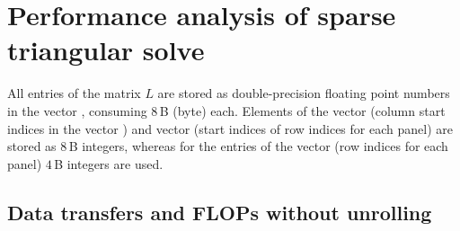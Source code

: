 \section{Performance analysis of sparse triangular solve}
\label{sec:sds}


All entries %
of the matrix $L$
are stored as double-precision floating point
numbers in the vector \vlnz{}, consuming $8$\,B (byte) each.
Elements of the vector \vxlnz{} (column start indices in the vector \vlnz{}) and vector \vxindx{} (start
indices of row indices for each panel) are stored as $8$\,B integers,
whereas for the entries of the vector \vindx{} (row indices for each panel) $4$\,B integers
are used.
\enlargethispage*{\baselineskip}

\subsection{Data transfers and FLOPs without unrolling}
\label{sec:pm:dt}
\label{sec:pm:dt:wou}

% 

